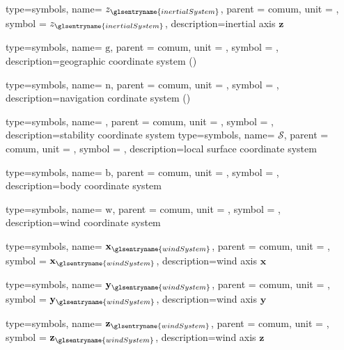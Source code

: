 {type=symbols,
  name= \ensuremath{z_{\glsentryname{inertialSystem}}},
  parent = {comum},
  unit = \unexpanded{},
  symbol = \ensuremath{z_{\glsentryname{inertialSystem}}},
  description={inertial axis $\mathbf{z}$}
}

{type=symbols,
  name= \ensuremath{\mathrm{g}},
  parent = {comum},
  unit = \unexpanded{},
  symbol = ,
  description={geographic coordinate system ()}
}

{type=symbols,
  name= \ensuremath{\mathrm{n}},
  parent = {comum},
  unit = \unexpanded{},
  symbol = ,
  description={navigation cordinate system  ()}
}



{type=symbols,
  name= \ensuremath{\mathrm{}},
  parent = {comum},
  unit = \unexpanded{},
  symbol = ,
  description={stability coordinate system}
}
{type=symbols,
  name= \ensuremath{\mathcal{S}},
  parent = {comum},
  unit = \unexpanded{},
  symbol = ,
  description={local surface coordinate system}
}

{type=symbols,
  name= \ensuremath{\mathrm{b}},
  parent = {comum},
  unit = \unexpanded{},
  symbol = ,
  description={body coordinate system}
}

{type=symbols,
  name= \ensuremath{\mathrm{w}},
  parent = {comum},
  unit = \unexpanded{},
  symbol = ,
  description={wind coordinate system}
}

{type=symbols,
  name= \ensuremath{\mathbf{x}_{\glsentryname{windSystem}}},
  parent = {comum},
  unit = \unexpanded{},
  symbol = \ensuremath{\mathbf{x}_{\glsentryname{windSystem}}},
  description={wind axis $\mathbf{x}$}
}

{type=symbols,
  name= \ensuremath{\mathbf{y}_{\glsentryname{windSystem}}},
  parent = {comum},
  unit = \unexpanded{},
  symbol = \ensuremath{\mathbf{y}_{\glsentryname{windSystem}}},
  description={wind axis $\mathbf{y}$}
}



{type=symbols,
  name= \ensuremath{\mathbf{z}_{\glsentryname{windSystem}}},
  parent = {comum},
  unit = \unexpanded{},
  symbol = \ensuremath{\mathbf{z}_{\glsentryname{windSystem}}},
  description={wind axis $\mathbf{z}$}
}


